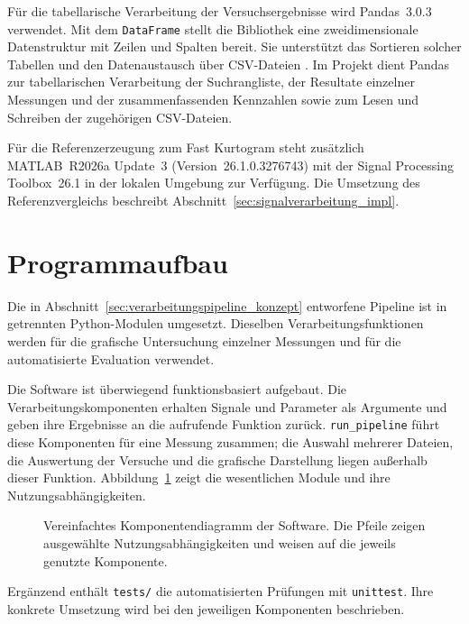 Für die tabellarische Verarbeitung der Versuchsergebnisse wird
Pandas~3.0.3 verwendet. Mit dem \texttt{DataFrame} stellt die Bibliothek eine
zweidimensionale Datenstruktur mit Zeilen und Spalten bereit. Sie unterstützt
das Sortieren solcher Tabellen und den Datenaustausch über CSV-Dateien
\cite{pandas10MinutesPandas}.
Im Projekt dient Pandas zur tabellarischen Verarbeitung der Suchrangliste,
der Resultate einzelner Messungen und der zusammenfassenden Kennzahlen
sowie zum Lesen und Schreiben der zugehörigen CSV-Dateien.

Für die Referenzerzeugung zum Fast Kurtogram steht zusätzlich MATLAB~R2026a
Update~3 (Version~26.1.0.3276743) mit der Signal Processing Toolbox~26.1
in der lokalen Umgebung zur Verfügung. Die Umsetzung des
Referenzvergleichs beschreibt Abschnitt~\ref{sec:signalverarbeitung_impl}.

\section{Programmaufbau}
\label{sec:softwarestruktur}

Die in Abschnitt~\ref{sec:verarbeitungspipeline_konzept} entworfene Pipeline
ist in getrennten Python-Modulen umgesetzt. Dieselben Verarbeitungsfunktionen
werden für die grafische Untersuchung einzelner Messungen und für die
automatisierte Evaluation verwendet.

\label{subsec:module_konfiguration_impl}
\begingroup
\setlength{\emergencystretch}{2em}
Die Software ist überwiegend funktionsbasiert aufgebaut. Die
Verarbeitungskomponenten erhalten Signale und Parameter als Argumente und
geben ihre Ergebnisse an die aufrufende Funktion zurück.
\texttt{run\_pipeline} führt diese Komponenten für eine Messung zusammen;
die Auswahl mehrerer Dateien, die Auswertung der Versuche und die grafische
Darstellung liegen außerhalb dieser Funktion.
Abbildung~\ref{tab:modulorganisation_impl} zeigt die wesentlichen Module
und ihre Nutzungsabhängigkeiten.

\begin{figure}[htbp]
  \centering
  
  \caption[Komponentendiagramm der Software]{Vereinfachtes
    Komponentendiagramm der Software. Die Pfeile zeigen
    ausgewählte Nutzungsabhängigkeiten und weisen auf die jeweils genutzte
    Komponente.}
  \label{tab:modulorganisation_impl}
\end{figure}

Ergänzend enthält \texttt{tests/} die automatisierten Prüfungen mit
\texttt{unittest}. Ihre konkrete Umsetzung wird bei den jeweiligen
Komponenten beschrieben.

